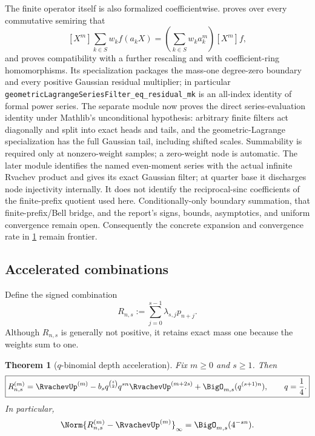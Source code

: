 \documentclass[11pt]{article}
\numberwithin{equation}{section}
\newtheorem{theorem}{Theorem}[section]
\theoremstyle{definition}
\theoremstyle{remark}
\begin{document}
The finite operator itself is also formalized coefficientwise.
 proves over every commutative semiring
that
\[
 [X^m]\sum_{k\in S}w_k f(a_kX)
 =\left(\sum_{k\in S}w_ka_k^m\right)[X^m]f,
\]
and proves compatibility with a further rescaling and with coefficient-ring
homomorphisms.  Its specialization 
packages the mass-one degree-zero boundary and every positive Gaussian
residual multiplier; in particular
\nolinkurl{geometricLagrangeSeriesFilter_eq_residual_mk} is an all-index
identity of formal power series.  The separate module
 now proves the direct series-evaluation
identity under Mathlib's unconditional  hypothesis: arbitrary
finite filters act diagonally and split into exact heads and tails, and the
geometric-Lagrange specialization has the full Gaussian tail, including shifted
scales.  Summability is required only at nonzero-weight samples; a zero-weight
node is automatic.  The later module
 identifies the named even-moment series
with the actual infinite Rvachev product and gives its exact Gaussian filter;
at quarter base it discharges node injectivity internally.  It does not
identify the reciprocal-sinc coefficients of the finite-prefix quotient used
here.  Conditionally-only boundary summation, that finite-prefix/Bell bridge,
and the report's signs, bounds, asymptotics, and uniform convergence remain
open.  Consequently the concrete expansion and convergence rate in
\cref{p1:thm:q-richardson} remain frontier.

\subsection{Accelerated combinations}

Define the signed combination
\begin{equation}
 R_{n,s}:=\sum_{j=0}^{s-1}\lambda_{s,j}p_{n+j}.
 \label{p1:eq:Rns}
\end{equation}
Although $R_{n,s}$ is generally not positive, it retains exact mass one because the weights sum to one.

\begin{theorem}[$q$-binomial depth acceleration]
\label{p1:thm:q-richardson}
Fix $m\ge0$ and $s\ge1$.  Then
\begin{equation}
 \boxed{
 R_{n,s}^{(m)}
 =\RvachevUp^{(m)}
 -b_sq^{\binom s2}q^{sn}\RvachevUp^{(m+2s)}
 +\BigO_{m,s}(q^{(s+1)n}),
 \qquad q=\frac14.}
 \label{p1:eq:q-richardson-asymptotic}
\end{equation}
In particular,
\begin{equation}
 \Norm{R_{n,s}^{(m)}-\RvachevUp^{(m)}}_\infty=\BigO_{m,s}(4^{-sn}).
 \label{p1:eq:q-richardson-rate}
\end{equation}
\end{theorem}
\end{document}
